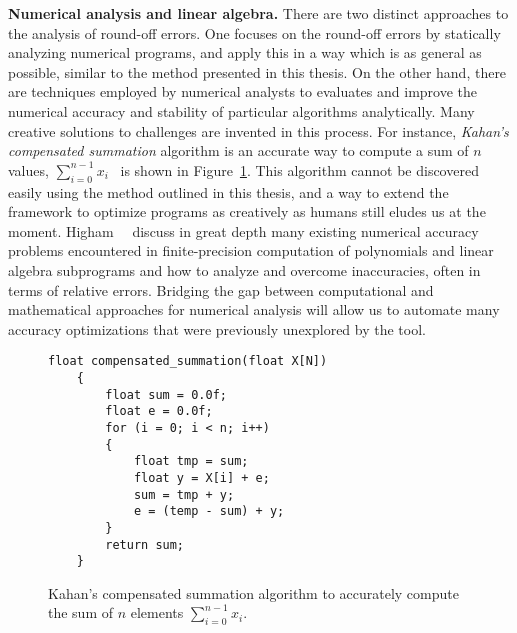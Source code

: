 \textbf{Numerical analysis and linear algebra.}  There are two distinct
approaches to the analysis of round-off errors.  One focuses on the round-off
errors by statically analyzing numerical programs, and apply this in a way
which is as general as possible, similar to the method presented in this
thesis.  On the other hand, there are techniques employed by numerical analysts
to evaluates and improve the numerical accuracy and stability of particular
algorithms analytically.  Many creative solutions to challenges are invented
in this process.  For instance, \emph{Kahan's compensated summation} algorithm
is an accurate way to compute a sum of $n$ values, $\sum_{i = 0}^{n-1}
x_i$~\cite{kahan65} is shown in Figure~\ref{co:lst:sum}.  This algorithm
cannot be discovered easily using the method outlined in this thesis, and a
way to extend the framework to optimize programs as creatively as humans still
eludes us at the moment.  Higham~\etal~\cite{higham02} discuss in great depth
many existing numerical accuracy problems encountered in finite-precision
computation of polynomials and linear algebra subprograms and how to analyze
and overcome inaccuracies, often in terms of relative errors.  Bridging the
gap between computational and mathematical approaches for numerical analysis
will allow us to automate many accuracy optimizations that were previously
unexplored by the tool.
\begin{figure}[ht]
    \centering
\begin{lstlisting}[]
    float compensated_summation(float X[N])
    {
        float sum = 0.0f;
        float e = 0.0f;
        for (i = 0; i < n; i++)
        {
            float tmp = sum;
            float y = X[i] + e;
            sum = tmp + y;
            e = (temp - sum) + y;
        }
        return sum;
    }
\end{lstlisting}
    \caption{%
        Kahan's compensated summation algorithm to accurately compute the sum
        of $n$ elements $\sum_{i = 0}^{n-1} x_i$.
    }\label{co:lst:sum}
\end{figure}


